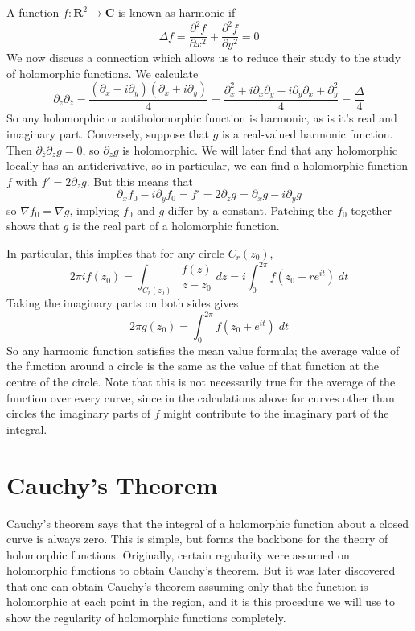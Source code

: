 A function $f: \mathbf{R}^2 \to \mathbf{C}$ is known as harmonic if
%
\[ \Delta f = \frac{\partial^2 f}{\partial x^2} + \frac{\partial^2 f}{\partial y^2} = 0 \]
%
We now discuss a connection which allows us to reduce their study to the study of holomorphic functions. We calculate
%
\[ \partial_z \partial_{\overline{z}} = \frac{(\partial_x - i \partial_y)(\partial_x + i \partial_y)}{4} = \frac{\partial^2_x + i \partial_x \partial_y - i \partial_y \partial_x + \partial_y^2}{4} = \frac{\Delta}{4} \]
%
So any holomorphic or antiholomorphic function is harmonic, as is it's real and imaginary part. Conversely, suppose that $g$ is a real-valued harmonic function. Then $\partial_{\overline{z}} \partial_z g = 0$, so $\partial_z g$ is holomorphic. We will later find that any holomorphic locally has an antiderivative, so in particular, we can find a holomorphic function $f$ with $f' = 2 \partial_z g$. But this means that
%
\[ \partial_x f_0 - i \partial_y f_0 = f' = 2 \partial_z g = \partial_x g - i \partial_y g \]
%
so $\nabla f_0 = \nabla g$, implying $f_0$ and $g$ differ by a constant. Patching the $f_0$ together shows that $g$ is the real part of a holomorphic function.

In particular, this implies that for any circle $C_r(z_0)$,
%
\[ 2 \pi i f(z_0) = \int_{C_r(z_0)} \frac{f(z)}{z - z_0}\; dz = i \int_0^{2\pi} f(z_0 + r e^{it})\; dt  \]
%
Taking the imaginary parts on both sides gives
%
\[ 2 \pi g(z_0) = \int_0^{2\pi} f(z_0 + e^{it})\; dt \]
%
So any harmonic function satisfies the mean value formula; the average value of the function around a circle is the same as the value of that function at the centre of the circle. Note that this is not necessarily true for the average of the function over every curve, since in the calculations above for curves other than circles the imaginary parts of $f$ might contribute to the imaginary part of the integral.







\chapter{Cauchy's Theorem}

Cauchy's theorem says that the integral of a holomorphic function about a closed curve is always zero. This is simple, but forms the backbone for the theory of holomorphic functions. Originally, certain regularity were assumed on holomorphic functions to obtain Cauchy's theorem. But it was later discovered that one can obtain Cauchy's theorem assuming only that the function is holomorphic at each point in the region, and it is this procedure we will use to show the regularity of holomorphic functions completely.

